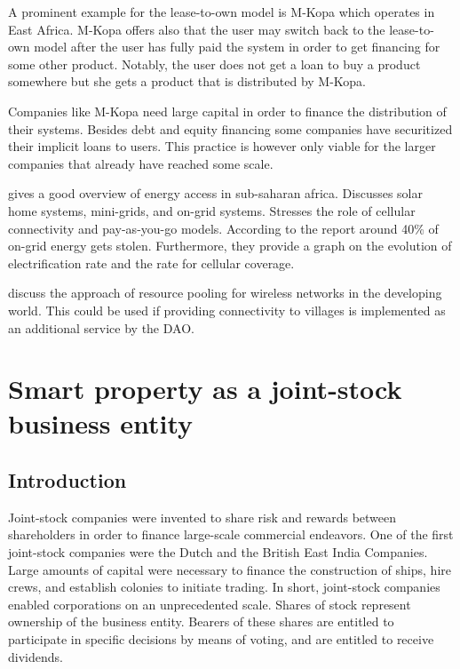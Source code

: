 A prominent example for the lease-to-own model is M-Kopa which operates in East Africa. M-Kopa offers also that the user may switch back to the lease-to-own model after the user has fully paid the system in order to get financing for some other product. Notably, the user does not get a loan to buy a product somewhere but she gets a product that is distributed by M-Kopa. 

Companies like M-Kopa need large capital in order to finance the distribution of their systems. Besides debt and equity financing some companies have securitized their implicit loans to users. This practice is however only viable for the larger companies that already have reached some scale. 



\cite{gsma2014} gives a good overview of energy access in sub-saharan africa. Discusses solar home systems, mini-grids, and on-grid systems. Stresses the role of cellular connectivity and pay-as-you-go models. According to the report around 40\% of on-grid energy gets stolen. Furthermore, they provide a graph on the evolution of electrification rate and the rate for cellular coverage.

\cite{DBLP:journals/corr/QadirSWC16} discuss the approach of resource pooling for wireless networks in the developing world. This could be used if providing connectivity to villages is implemented as an additional service by the DAO.


\chapter{Smart property as a joint-stock business entity}

\section{Introduction}

Joint-stock companies were invented to share risk and rewards between shareholders in order to finance large-scale commercial endeavors. One of the first joint-stock companies were the Dutch and the British East India Companies. Large amounts of capital were necessary to finance the construction of ships, hire crews, and establish colonies to initiate trading. In short, joint-stock companies enabled corporations on an unprecedented scale. Shares of stock represent  ownership of the business entity. Bearers of these shares are entitled to participate in specific decisions by means of voting, and are entitled to receive dividends. 

